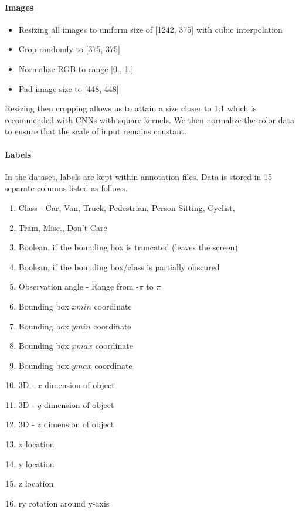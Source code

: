\documentclass{article}
\begin{document}
\paragraph{Images}
\begin{itemize}
    \item Resizing all images to uniform size of [1242, 375] with cubic interpolation
    \item Crop randomly to [375, 375]
    \item Normalize RGB to range [0., 1.]
    \item Pad image size to [448, 448]
\end{itemize}
Resizing then cropping allows us to attain a size closer to 1:1 which is recommended with CNNs with square kernels. We then normalize the color data to ensure that the scale of input remains constant.

\paragraph{Labels}
In the dataset, labels are kept within annotation files. Data is stored in 15 separate columns listed as follows.
\begin{enumerate}
    \item Class - Car, Van, Truck, Pedestrian, Person Sitting, Cyclist, \item Tram, Misc., Don't Care
    \item Boolean, if the bounding box is truncated (leaves the screen)
    \item Boolean, if the bounding box/class is partially obscured
    \item Observation angle - Range from -$\pi$ to $\pi$
    \item Bounding box $x min$ coordinate
    \item Bounding box $y min$ coordinate
    \item Bounding box $x max$ coordinate
    \item Bounding box $y max$ coordinate
    \item 3D - $x$ dimension of object
    \item 3D - $y$ dimension of object
    \item 3D - $z$ dimension of object
    \item x location
    \item y location
    \item z location
    \item ry rotation around y-axis
\end{enumerate}
\end{document}

